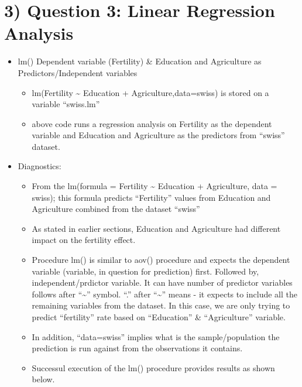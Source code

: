 \documentclass[]{article}
\providecommand{\tightlist}{%
  \setlength{\itemsep}{0pt}\setlength{\parskip}{0pt}}
\begin{document}
\hypertarget{question-3-linear-regression-analysis}{%
\section{3) Question 3: Linear Regression
Analysis}\label{question-3-linear-regression-analysis}}

\begin{itemize}
\tightlist
\item
  lm() \textbar{} Dependent variable (Fertility) \& Education and
  Agriculture as Predictors/Independent variables

  \begin{itemize}
  \tightlist
  \item
    lm(Fertility \textasciitilde{} Education + Agriculture,data=swiss)
    is stored on a variable ``swiss.lm''
  \item
    above code runs a regression analysis on Fertility as the dependent
    variable and Education and Agriculture as the predictors from
    ``swiss'' dataset.
  \end{itemize}
\item
  Diagnostics:

  \begin{itemize}
  \tightlist
  \item
    From the lm(formula = Fertility \textasciitilde{} Education +
    Agriculture, data = swiss); this formula predicts ``Fertility''
    values from Education and Agriculture combined from the dataset
    ``swiss''
  \item
    As stated in earlier sections, Education and Agriculture had
    different impact on the fertility effect.
  \item
    Procedure lm() is similar to aov() procedure and expects the
    dependent variable (variable, in question for prediction) first.
    Followed by, independent/prdictor variable. It can have number of
    predictor variables follows after ``\textasciitilde{}'' symbol.
    ``.'' after ``\textasciitilde{}'' means - it expects to include all
    the remaining variables from the dataset. In this case, we are only
    trying to predict ``fertility'' rate based on ``Education'' \&
    ``Agriculture'' variable.
  \item
    In addition, ``data=swiss'' implies what is the sample/population
    the prediction is run against from the observations it contains.
  \item
    Successul execution of the lm() procedure provides results as shown
    below.


\end{itemize}
\end{itemize}
\end{document}
